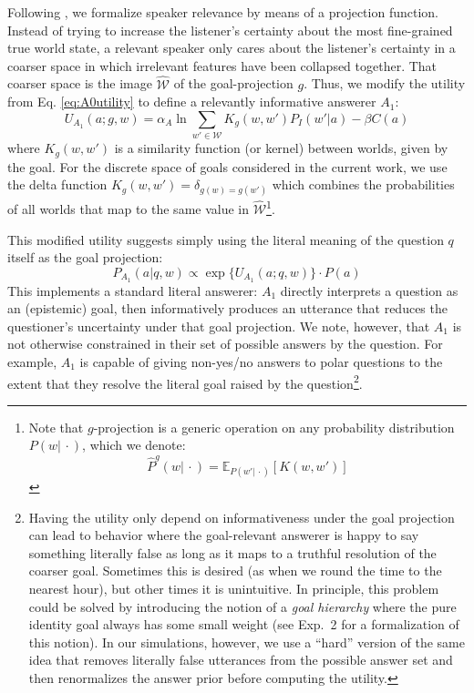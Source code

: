 \documentclass[11pt, floatsintext]{apa6}
\newcommand{\E}[2]{\ensuremath{\mathbb{E}_{#1}\left [#2 \right]}}
\begin{document}
Following , we formalize speaker relevance by means of a projection function. Instead of trying to increase the listener's certainty about the most fine-grained true world state, a relevant speaker only cares about the listener's certainty in a coarser space in which irrelevant features have been collapsed together. That coarser space is the image $\widehat{\mathcal{W}}$ of the goal-projection $g$.
Thus, we modify the utility from Eq. \ref{eq:A0utility} to define a relevantly informative answerer $A_1$: 
\begin{equation}
U_{A_1}(a; g, w) = \alpha_A \ln \sum_{w' \in \mathcal{W}} K_g(w, w') P_I(w' | a) - \beta C(a)
\end{equation}
where $K_g(w,w')$ is a similarity function (or kernel) between worlds, given by the goal. 
For the discrete space of goals considered in the current work, we use the delta function $K_g(w,w') = \delta_{g(w)=g(w')}$ which combines the probabilities of all worlds that map to the same value in $\widehat{\mathcal{W}}$\footnote{Note that $g$-projection is a generic operation on any probability distribution $P(w|\,\cdot)$, which we denote: 
$$\widehat{P}^g(w|\, \cdot) = \E{P(w'|\, \cdot)}{K(w,w')}$$
}.

This modified utility suggests simply using the literal meaning of the question $q$ itself as the goal projection:
$$P_{A_1}(a|q,w) \propto \exp\{U_{A_1}(a; q,w)\} \cdot P(a)$$
This implements a standard literal answerer: $A_1$ directly interprets a question as an (epistemic) goal, then informatively produces an utterance that reduces the questioner's uncertainty under that goal projection.
We note, however, that $A_1$ is not otherwise constrained in their set of possible answers by the question. 
For example, $A_1$ is capable of giving non-yes/no answers to polar questions to the extent that they resolve the literal goal raised by the question\footnote{Having the utility only depend on informativeness under the goal projection can lead to behavior where the goal-relevant answerer is happy to say something literally false as long as it maps to a truthful resolution of the coarser goal. Sometimes this is desired (as when we round the time to the nearest hour), but other times it is unintuitive. In principle, this problem could be solved by introducing the notion of a \emph{goal hierarchy} where the pure identity goal always has some small weight (see Exp.~2 for a formalization of this notion). In our simulations, however, we use a ``hard'' version of the same idea that removes literally false utterances from the possible answer set and then renormalizes the answer prior before computing the utility.}. 
\end{document}
